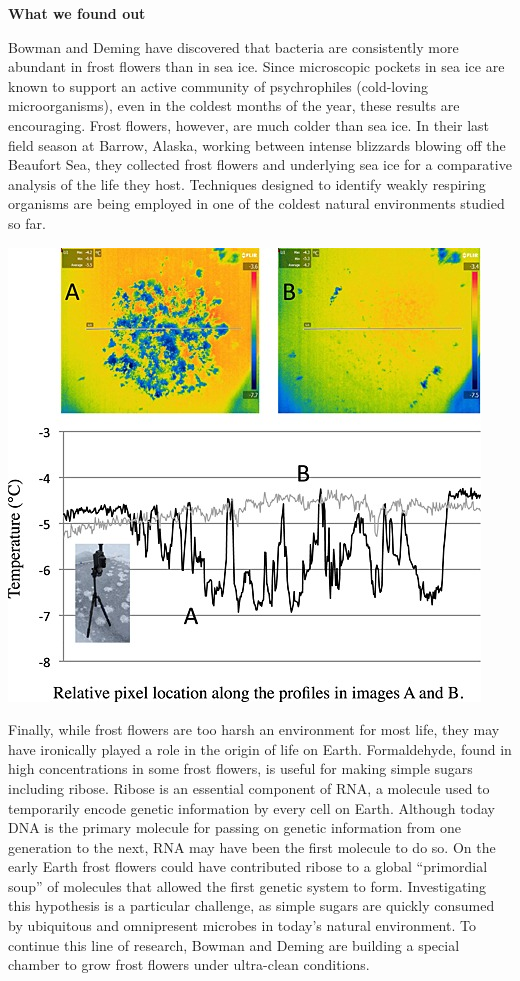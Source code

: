 \documentclass[]{book}
\begin{document}
\textbf{What we found out}

Bowman and Deming have discovered that bacteria are consistently more abundant in frost flowers than in sea ice. Since microscopic pockets in sea ice are known to support an active community of psychrophiles (cold-loving microorganisms), even in the coldest months of the year, these results are encouraging. Frost flowers, however, are much colder than sea ice. In their last field season at Barrow, Alaska, working between intense blizzards blowing off the Beaufort Sea, they collected frost flowers and underlying sea ice for a comparative analysis of the life they host. Techniques designed to identify weakly respiring organisms are being employed in one of the coldest natural environments studied so far.

\includegraphics{images/flowersdata.png}

Finally, while frost flowers are too harsh an environment for most life, they may have ironically played a role in the origin of life on Earth. Formaldehyde, found in high concentrations in some frost flowers, is useful for making simple sugars including ribose. Ribose is an essential component of RNA, a molecule used to temporarily encode genetic information by every cell on Earth. Although today DNA is the primary molecule for passing on genetic information from one generation to the next, RNA may have been the first molecule to do so. On the early Earth frost flowers could have contributed ribose to a global ``primordial soup'' of molecules that allowed the first genetic system to form. Investigating this hypothesis is a particular challenge, as simple sugars are quickly consumed by ubiquitous and omnipresent microbes in today's natural environment. To continue this line of research, Bowman and Deming are building a special chamber to grow frost flowers under ultra-clean conditions.
\end{document}
